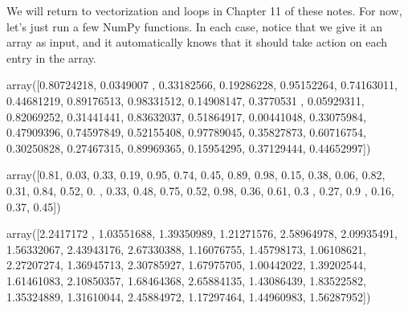 \documentclass[letterpaper,10pt,english]{sphinxmanual}
\begin{document}
We will return to vectorization and loops in Chapter 11 of these notes.  For now, let’s just run a few NumPy functions.  In each case, notice that we give it an array as input, and it automatically knows that it should take action on each entry in the array.

\begin{sphinxVerbatim}[commandchars=\\\{\}]
   
    
\end{sphinxVerbatim}

\begin{sphinxVerbatim}[commandchars=\\\{\}]
array([0.80724218, 0.0349007 , 0.33182566, 0.19286228, 0.95152264,
       0.74163011, 0.44681219, 0.89176513, 0.98331512, 0.14908147,
       0.3770531 , 0.05929311, 0.82069252, 0.31441441, 0.83632037,
       0.51864917, 0.00441048, 0.33075984, 0.47909396, 0.74597849,
       0.52155408, 0.97789045, 0.35827873, 0.60716754, 0.30250828,
       0.27467315, 0.89969365, 0.15954295, 0.37129444, 0.44652997])
\end{sphinxVerbatim}

\begin{sphinxVerbatim}[commandchars=\\\{\}]
    
\end{sphinxVerbatim}

\begin{sphinxVerbatim}[commandchars=\\\{\}]
array([0.81, 0.03, 0.33, 0.19, 0.95, 0.74, 0.45, 0.89, 0.98, 0.15, 0.38,
       0.06, 0.82, 0.31, 0.84, 0.52, 0.  , 0.33, 0.48, 0.75, 0.52, 0.98,
       0.36, 0.61, 0.3 , 0.27, 0.9 , 0.16, 0.37, 0.45])
\end{sphinxVerbatim}

\begin{sphinxVerbatim}[commandchars=\\\{\}]
   
\end{sphinxVerbatim}

\begin{sphinxVerbatim}[commandchars=\\\{\}]
array([2.2417172 , 1.03551688, 1.39350989, 1.21271576, 2.58964978,
       2.09935491, 1.56332067, 2.43943176, 2.67330388, 1.16076755,
       1.45798173, 1.06108621, 2.27207274, 1.36945713, 2.30785927,
       1.67975705, 1.00442022, 1.39202544, 1.61461083, 2.10850357,
       1.68464368, 2.65884135, 1.43086439, 1.83522582, 1.35324889,
       1.31610044, 2.45884972, 1.17297464, 1.44960983, 1.56287952])
\end{sphinxVerbatim}
\end{document}
